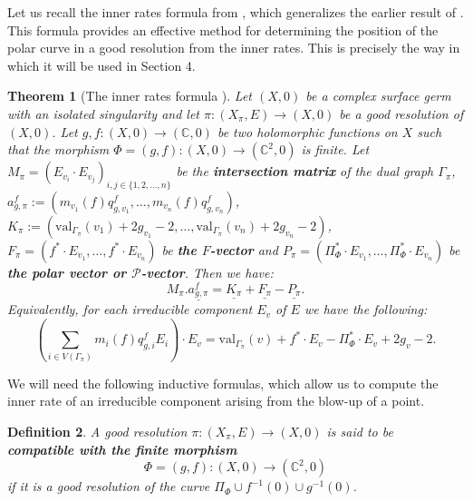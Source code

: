 \documentclass[reqno,dvipsnames,12pt]{amsart}
\newtheorem{thm}{Theorem}[section]
\newtheorem{defi}[thm]{Definition}
\begin{document}
Let us recall the inner rates formula from \cite[Theorem A]{yenni1}, which generalizes the earlier result of \cite[Theorem 4.3]{BFP}. This formula provides an effective method for determining the position of the polar curve in a good resolution from the inner rates. This is precisely the way in which it will be used in Section 4.
  \begin{thm}[{The inner rates formula \cite[Theorem A]{yenni1}}] \label{laplacien} Let $(X,0)$ be a complex surface germ with an isolated singularity and let $\pi :(X_{\pi},E) \longrightarrow (X,0) $ be a good resolution of $(X,0)$. Let $g,f:(X,0) \longrightarrow (\mathbb{C},0)$ be two holomorphic functions on $X$ such that the morphism $\Phi=(g,f): (X,0) \longrightarrow (\mathbb{C}^2,0)$ is finite. Let $M_{\pi}=(E_{v_i} \cdot E_{v_j})_{i,j \in \{1,2,\ldots,n\}}$ be the \textbf{intersection matrix} of the dual graph $\Gamma_{\pi}$, $a_{g,\pi}^f:=(m_{v_1}{(f)}q_{g, v_1}^f,\ldots,m_{v_n}(f)q_{g, v_n}^f)$, $K_{\pi} :=( \mathrm{val}_{\Gamma_{\pi}} (v_1) +2g_{v_1}-2,\ldots,\mathrm{val}_{\Gamma_{\pi}} (v_n) +2g_{v_n}-2)$, $F_{\pi}=(f^* \cdot E_{v_1},\ldots,f^* \cdot E_{v_n} )$ be \textbf{the $F$-vector } and 
$P_{\pi}=(\Pi_{\Phi}^* \cdot E_{v_1},\ldots,\Pi_{\Phi}^* \cdot E_{v_n})$ be \textbf{the polar vector or $\mathcal{P}$-vector}. Then we have:
$$M_{\pi}  .\underline{a_{g,\pi}^f}=\underline{K_{\pi}}+\underline{F_{\pi}}-\underline{P_{\pi}}.$$
Equivalently, for each irreducible component $E_v$ of $E$ we have the  following:
$$
 \left( \sum_{i \in V(\Gamma_{\pi})} m_{i}(f)q_{g,i}^f E_i  \right) \cdot E_{v}= \mathrm{val}_{\Gamma_{\pi}}(v)+f^* \cdot E_v-\Pi_{\Phi}^* \cdot E_v+2g_v-2.
$$
\end{thm}
We will need the following inductive formulas, which allow us to compute the inner rate of an irreducible component arising from the blow-up of a point.
\begin{defi}
A good resolution $\pi \colon (X_\pi, E) \longrightarrow (X,0)$ is said to be \textbf{compatible with the finite morphism}
\[
\Phi = (g,f) \colon (X,0) \longrightarrow (\mathbb{C}^2,0)
\]
if it is a good resolution of the curve $\Pi_{\Phi} \cup f^{-1}(0) \cup g^{-1}(0)$.
\end{defi}

 
 
\end{document}
